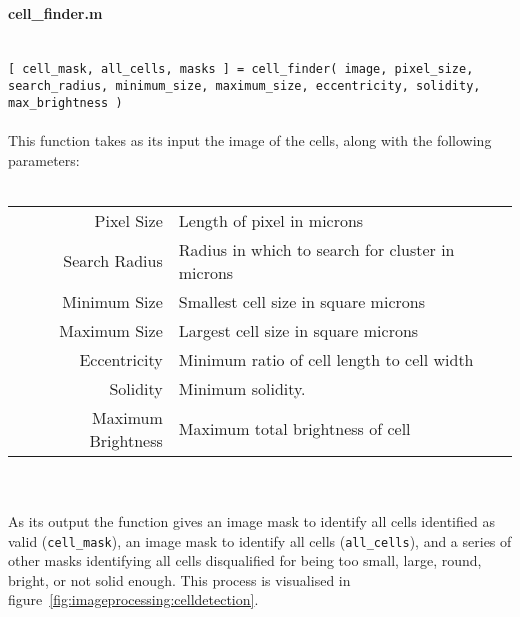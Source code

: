 \documentclass[../main.tex]{subfiles}
\begin{document}
\paragraph{cell\_finder.m}\ \\
\texttt{[ cell\_mask, all\_cells, masks ] = cell\_finder( image, pixel\_size, search\_radius, minimum\_size, maximum\_size, eccentricity, solidity, max\_brightness ) }
\\\\
This function takes as its input the image of the cells, along with the following parameters:
\\\\
\begin{tabular}{rl}
Pixel Size		&	Length of pixel in microns\\
Search Radius 	&	Radius in which to search for cluster in microns\\
Minimum Size		&	Smallest cell size in square microns\\
Maximum Size		&	Largest cell size in square microns\\
Eccentricity		&	Minimum ratio of cell length to cell width\\
Solidity			&	Minimum solidity\myfootnotemark.\\
Maximum Brightness	&	Maximum total brightness of cell
\end{tabular}
\\\\
As its output the function gives an image mask to identify all cells identified as valid (\texttt{cell\_mask}), an image mask to identify all cells (\texttt{all\_cells}), and a series of other masks identifying all cells disqualified for being too small, large, round, bright, or not solid enough. This process is visualised in figure~\ref{fig:imageprocessing:celldetection}.
\end{document}

